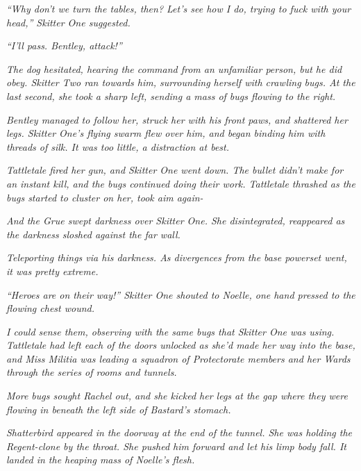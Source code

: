 \emph{``Why don't we turn the tables, then?  Let's see how I do, trying to fuck with your head,'' Skitter One suggested.}



\emph{``I'll pass.  Bentley, attack!''}



\emph{The dog hesitated, hearing the command from an unfamiliar person, but he did obey.  Skitter Two ran towards him, surrounding herself with crawling bugs.  At the last second, she took a sharp left, sending a mass of bugs flowing to the right.}



\emph{Bentley managed to follow her, struck her with his front paws, and shattered her legs.  Skitter One's flying swarm flew over him, and began binding him with threads of silk.  It was too little, a distraction at best.}



\emph{Tattletale fired her gun, and Skitter One went down.  The bullet didn't make for an instant kill, and the bugs continued doing their work.  Tattletale thrashed as the bugs started to cluster on her, took aim again-}



\emph{And the Grue swept darkness over Skitter One.  She disintegrated, reappeared as the darkness sloshed against the far wall.}



\emph{Teleporting things via his darkness.  As divergences from the base powerset went, it was pretty extreme.}



\emph{``Heroes are on their way!'' Skitter One shouted to Noelle, one hand pressed to the flowing chest wound.}



\emph{I could sense them, observing with the same bugs that Skitter One was using.  Tattletale had left each of the doors unlocked as she'd made her way into the base, and Miss Militia was leading a squadron of Protectorate members and her Wards through the series of rooms and tunnels.}



\emph{More bugs sought Rachel out, and she kicked her legs at the gap where they were flowing in beneath the left side of Bastard's stomach.}



\emph{Shatterbird appeared in the doorway at the end of the tunnel.  She was holding the Regent-clone by the throat.  She pushed him forward and let his limp body fall.  It landed in the heaping mass of Noelle's flesh.}



